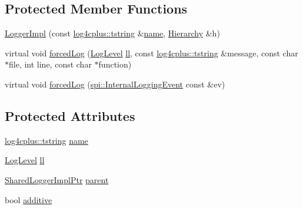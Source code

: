 \subsection*{Protected Member Functions}
\begin{DoxyCompactItemize}
\item 
\hyperlink{classlog4cplus_1_1spi_1_1LoggerImpl_a7f007b2bc5fdf91343b13319cf0b792c}{Logger\-Impl} (const \hyperlink{namespacelog4cplus_a3c9287f6ebcddc50355e29d71152117b}{log4cplus\-::tstring} \&\hyperlink{classlog4cplus_1_1spi_1_1LoggerImpl_af746144fa2121b3bb6567c71e15a3d8d}{name}, \hyperlink{classlog4cplus_1_1Hierarchy}{Hierarchy} \&h)
\item 
virtual void \hyperlink{classlog4cplus_1_1spi_1_1LoggerImpl_afc768816ab0e28e4c4bbfcd964ffa572}{forced\-Log} (\hyperlink{namespacelog4cplus_abd332cc8c98fefcbbdcf57b6b3867de9}{Log\-Level} \hyperlink{classlog4cplus_1_1spi_1_1LoggerImpl_a8a3672445f1145629a59e27655c480c4}{ll}, const \hyperlink{namespacelog4cplus_a3c9287f6ebcddc50355e29d71152117b}{log4cplus\-::tstring} \&message, const char $\ast$file, int line, const char $\ast$function)
\item 
virtual void \hyperlink{classlog4cplus_1_1spi_1_1LoggerImpl_a86133683d8240c71aef7c7f209460b97}{forced\-Log} (\hyperlink{classlog4cplus_1_1spi_1_1InternalLoggingEvent}{spi\-::\-Internal\-Logging\-Event} const \&ev)
\end{DoxyCompactItemize}
\subsection*{Protected Attributes}
\begin{DoxyCompactItemize}
\item 
\hyperlink{namespacelog4cplus_a3c9287f6ebcddc50355e29d71152117b}{log4cplus\-::tstring} \hyperlink{classlog4cplus_1_1spi_1_1LoggerImpl_af746144fa2121b3bb6567c71e15a3d8d}{name}
\item 
\hyperlink{namespacelog4cplus_abd332cc8c98fefcbbdcf57b6b3867de9}{Log\-Level} \hyperlink{classlog4cplus_1_1spi_1_1LoggerImpl_a8a3672445f1145629a59e27655c480c4}{ll}
\item 
\hyperlink{classlog4cplus_1_1spi_1_1LoggerImpl_a714f4769a8d2b7f954eb193df7bcd256}{Shared\-Logger\-Impl\-Ptr} \hyperlink{classlog4cplus_1_1spi_1_1LoggerImpl_a8a3f29bd44b2897f2f694fd8e1847d2e}{parent}
\item 
bool \hyperlink{classlog4cplus_1_1spi_1_1LoggerImpl_ae41a18de17a3693b52fd4e37234a5045}{additive}
\end{DoxyCompactItemize}
